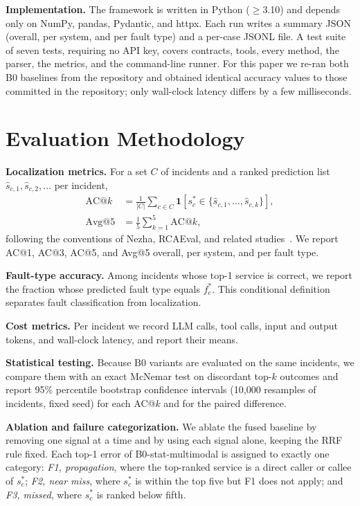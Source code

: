 \documentclass[conference]{IEEEtran}
\begin{document}
\textbf{Implementation.} The framework is written in Python ($\ge$3.10) and depends only on NumPy, pandas, Pydantic, and httpx. Each run writes a summary JSON (overall, per system, and per fault type) and a per-case JSONL file. A test suite of seven tests, requiring no API key, covers contracts, tools, every method, the parser, the metrics, and the command-line runner. For this paper we re-ran both B0 baselines from the repository and obtained identical accuracy values to those committed in the repository; only wall-clock latency differs by a few milliseconds.

\section{Evaluation Methodology}\label{sec:evalmethod}

\textbf{Localization metrics.} For a set $C$ of incidents and a ranked prediction list $\hat{s}_{c,1},\hat{s}_{c,2},\ldots$ per incident,
\begin{align}
\text{AC@}k&=\frac{1}{|C|}\sum_{c\in C}\mathbf{1}\left[s^\ast_c\in\{\hat{s}_{c,1},\ldots,\hat{s}_{c,k}\}\right],\\
\text{Avg@}5&=\frac{1}{5}\sum_{k=1}^{5}\text{AC@}k,
\end{align}
following the conventions of Nezha, RCAEval, and related studies~\cite{yu2023nezha,pham2025rcaeval,pham2024baro}. We report AC@1, AC@3, AC@5, and Avg@5 overall, per system, and per fault type.

\textbf{Fault-type accuracy.} Among incidents whose top-1 service is correct, we report the fraction whose predicted fault type equals $f^\ast_c$. This conditional definition separates fault classification from localization.

\textbf{Cost metrics.} Per incident we record LLM calls, tool calls, input and output tokens, and wall-clock latency, and report their means.

\textbf{Statistical testing.} Because B0 variants are evaluated on the same incidents, we compare them with an exact McNemar test on discordant top-$k$ outcomes and report 95\% percentile bootstrap confidence intervals (10{,}000 resamples of incidents, fixed seed) for each AC@$k$ and for the paired difference.

\textbf{Ablation and failure categorization.} We ablate the fused baseline by removing one signal at a time and by using each signal alone, keeping the RRF rule fixed. Each top-1 error of B0-stat-multimodal is assigned to exactly one category: \emph{F1, propagation}, where the top-ranked service is a direct caller or callee of $s^\ast_c$; \emph{F2, near miss}, where $s^\ast_c$ is within the top five but F1 does not apply; and \emph{F3, missed}, where $s^\ast_c$ is ranked below fifth.
\end{document}
